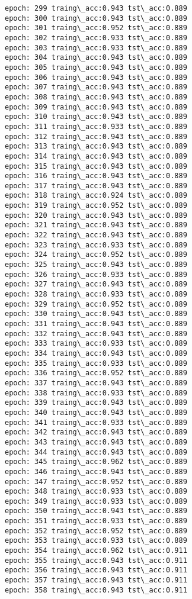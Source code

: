\documentclass[11pt]{article}
\begin{document}
\begin{Verbatim}[commandchars=\\\{\}]
epoch: 299 traing\_acc:0.943 tst\_acc:0.889
epoch: 300 traing\_acc:0.943 tst\_acc:0.889
epoch: 301 traing\_acc:0.952 tst\_acc:0.889
epoch: 302 traing\_acc:0.933 tst\_acc:0.889
epoch: 303 traing\_acc:0.933 tst\_acc:0.889
epoch: 304 traing\_acc:0.943 tst\_acc:0.889
epoch: 305 traing\_acc:0.943 tst\_acc:0.889
epoch: 306 traing\_acc:0.943 tst\_acc:0.889
epoch: 307 traing\_acc:0.943 tst\_acc:0.889
epoch: 308 traing\_acc:0.943 tst\_acc:0.889
epoch: 309 traing\_acc:0.943 tst\_acc:0.889
epoch: 310 traing\_acc:0.943 tst\_acc:0.889
epoch: 311 traing\_acc:0.933 tst\_acc:0.889
epoch: 312 traing\_acc:0.943 tst\_acc:0.889
epoch: 313 traing\_acc:0.943 tst\_acc:0.889
epoch: 314 traing\_acc:0.943 tst\_acc:0.889
epoch: 315 traing\_acc:0.943 tst\_acc:0.889
epoch: 316 traing\_acc:0.943 tst\_acc:0.889
epoch: 317 traing\_acc:0.943 tst\_acc:0.889
epoch: 318 traing\_acc:0.924 tst\_acc:0.889
epoch: 319 traing\_acc:0.952 tst\_acc:0.889
epoch: 320 traing\_acc:0.943 tst\_acc:0.889
epoch: 321 traing\_acc:0.943 tst\_acc:0.889
epoch: 322 traing\_acc:0.943 tst\_acc:0.889
epoch: 323 traing\_acc:0.933 tst\_acc:0.889
epoch: 324 traing\_acc:0.952 tst\_acc:0.889
epoch: 325 traing\_acc:0.943 tst\_acc:0.889
epoch: 326 traing\_acc:0.933 tst\_acc:0.889
epoch: 327 traing\_acc:0.943 tst\_acc:0.889
epoch: 328 traing\_acc:0.933 tst\_acc:0.889
epoch: 329 traing\_acc:0.952 tst\_acc:0.889
epoch: 330 traing\_acc:0.943 tst\_acc:0.889
epoch: 331 traing\_acc:0.943 tst\_acc:0.889
epoch: 332 traing\_acc:0.943 tst\_acc:0.889
epoch: 333 traing\_acc:0.933 tst\_acc:0.889
epoch: 334 traing\_acc:0.943 tst\_acc:0.889
epoch: 335 traing\_acc:0.933 tst\_acc:0.889
epoch: 336 traing\_acc:0.952 tst\_acc:0.889
epoch: 337 traing\_acc:0.943 tst\_acc:0.889
epoch: 338 traing\_acc:0.933 tst\_acc:0.889
epoch: 339 traing\_acc:0.943 tst\_acc:0.889
epoch: 340 traing\_acc:0.943 tst\_acc:0.889
epoch: 341 traing\_acc:0.933 tst\_acc:0.889
epoch: 342 traing\_acc:0.943 tst\_acc:0.889
epoch: 343 traing\_acc:0.943 tst\_acc:0.889
epoch: 344 traing\_acc:0.943 tst\_acc:0.889
epoch: 345 traing\_acc:0.962 tst\_acc:0.889
epoch: 346 traing\_acc:0.943 tst\_acc:0.889
epoch: 347 traing\_acc:0.952 tst\_acc:0.889
epoch: 348 traing\_acc:0.933 tst\_acc:0.889
epoch: 349 traing\_acc:0.933 tst\_acc:0.889
epoch: 350 traing\_acc:0.943 tst\_acc:0.889
epoch: 351 traing\_acc:0.933 tst\_acc:0.889
epoch: 352 traing\_acc:0.952 tst\_acc:0.889
epoch: 353 traing\_acc:0.933 tst\_acc:0.889
epoch: 354 traing\_acc:0.962 tst\_acc:0.911
epoch: 355 traing\_acc:0.943 tst\_acc:0.911
epoch: 356 traing\_acc:0.943 tst\_acc:0.911
epoch: 357 traing\_acc:0.943 tst\_acc:0.911
epoch: 358 traing\_acc:0.943 tst\_acc:0.911

\end{Verbatim}
\end{document}

